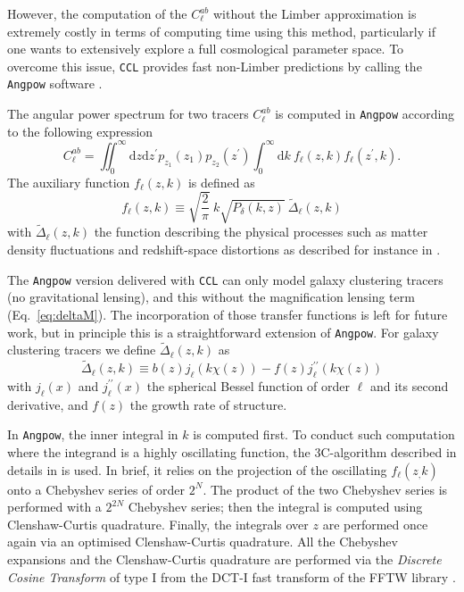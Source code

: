 \documentclass[\docopts]{\docclass}
\newcommand{\ccl}{{\tt CCL}\xspace}
\begin{document}
However, the computation of the $C^{ab}_\ell$ without the Limber approximation is extremely costly in terms of computing time using this method, particularly if one wants to extensively explore a full cosmological parameter space. To overcome this issue, \ccl provides fast non-Limber predictions by calling the \texttt{Angpow} software \citep{2017A&A...602A..72C}. 

The angular power spectrum for two tracers $C_{\ell}^{ab}$ is computed in \texttt{Angpow} according to the following expression
\begin{equation}
  C_{\ell}^{ab} = \iint_0^\infty \mathrm{d} z \mathrm{d} z^\prime  p_{z_1}(z_1) p_{z_2}(z^\prime) \int_0^\infty \mathrm{d} k\ f_{\ell}(z, k) f_{\ell}(z^\prime, k).
  \label{eq-clz1z2-obs}
\end{equation}
The auxiliary function $f_\ell(z,k)$ is defined as
\begin{equation}
f_\ell(z,k) \equiv  \sqrt{\frac{2}{\pi}}\  k \sqrt{P_\delta(k,z)}\ \widetilde{\Delta}_\ell(z,k)\label{eq-fell-func}
\end{equation}
with $\widetilde{\Delta}_\ell(z,k)$ the function describing the physical processes such as matter density fluctuations and redshift-space distortions as described for instance in \citet{2008cmb..book.....D,2009PhRvD..80h3514Y,2010PhRvD..82h3508Y, 2011PhRvD..84d3516C,2011PhRvD..84f3505B}.

The \texttt{Angpow} version delivered with \ccl can only model galaxy clustering tracers (no gravitational lensing), and this without the magnification lensing term (Eq.~\ref{eq:deltaM}). The incorporation of those transfer functions is left for future work, but in principle this is a straightforward extension of \texttt{Angpow}. For galaxy clustering tracers we define $\widetilde{\Delta}_\ell(z,k)$ as 
\begin{equation}
 \widetilde{\Delta}_\ell(z,k) \equiv b(z) j_\ell(k \chi(z)) - f(z) j_\ell^{\prime\prime}(k \chi(z)) 
\end{equation}
with $j_\ell(x)$ and $j_\ell^{\prime\prime}(x)$ the spherical Bessel function of order $\ell$ and its second derivative, and $f(z)$ the growth rate of structure.

In \texttt{Angpow}, the inner integral in $k$ is computed first.
To conduct such computation where the integrand is a highly oscillating function, the 3C-algorithm described in details in \citet{2017A&A...602A..72C} is used. In brief, it relies on the projection of the oscillating $f_\ell(z_,k)$ onto a Chebyshev series of order $2^N$. The product of the two Chebyshev series is performed with a $2^{2N}$ Chebyshev series; then the integral is computed using Clenshaw-Curtis quadrature. Finally, the integrals over $z$ are performed once again via an optimised Clenshaw-Curtis quadrature. All the Chebyshev expansions and the Clenshaw-Curtis quadrature are performed via the \textit{Discrete Cosine Transform} of type I from the DCT-I fast transform of the FFTW library \citep{FFTW}.
\end{document}
